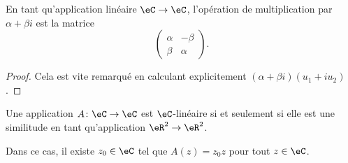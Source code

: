 \begin{lemma}       \label{LEMooJNFEooZCbJMo}
    En tant qu'application linéaire \( \eC\to \eC\), l'opération de multiplication par \( \alpha+\beta i\) est la matrice
    \begin{equation}
        \begin{pmatrix}
            \alpha    &   -\beta    \\ 
            \beta    &   \alpha    
        \end{pmatrix}.
    \end{equation}
\end{lemma}

\begin{proof}
    Cela est vite remarqué en calculant explicitement \( (\alpha+\beta i)(u_1+iu_2)\).
\end{proof}

\begin{lemma}
    Une application \( A\colon \eC\to \eC\) est \( \eC\)-linéaire si et seulement si elle est une similitude en tant qu'application \( \eR^2\to \eR^2\).

    Dans ce cas, il existe \( z_0\in \eC\) tel que \( A(z)=z_0z\) pour tout \( z\in \eC\).
\end{lemma}

